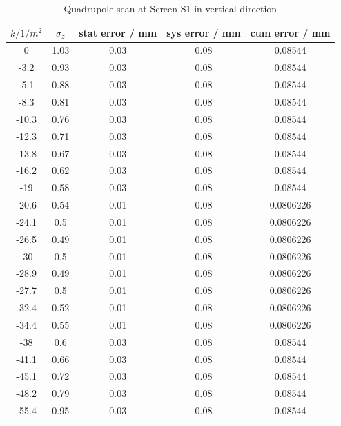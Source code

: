 \documentclass[11pt,a4paper,notitlepage]{scrartcl}
\begin{document}
\begin{table}[htbp]
		\centering
	\begin{tabular}{c|c|c|c|c}
		$k / 1/m^2$ & $\sigma_z$ & stat error / mm & sys error / mm & cum error / mm \\
		\hline
		\hline
		0         & 1.03    & 0.03            & 0.08           & 0.08544        \\
		-3.2      & 0.93    & 0.03            & 0.08           & 0.08544        \\
		-5.1      & 0.88    & 0.03            & 0.08           & 0.08544        \\
		-8.3      & 0.81    & 0.03            & 0.08           & 0.08544        \\
		-10.3     & 0.76    & 0.03            & 0.08           & 0.08544        \\
		-12.3     & 0.71    & 0.03            & 0.08           & 0.08544        \\
		-13.8     & 0.67    & 0.03            & 0.08           & 0.08544        \\
		-16.2     & 0.62    & 0.03            & 0.08           & 0.08544        \\
		-19       & 0.58    & 0.03            & 0.08           & 0.08544        \\
		-20.6     & 0.54    & 0.01            & 0.08           & 0.0806226      \\
		-24.1     & 0.5     & 0.01            & 0.08           & 0.0806226      \\
		-26.5     & 0.49    & 0.01            & 0.08           & 0.0806226      \\
		-30       & 0.5     & 0.01            & 0.08           & 0.0806226      \\
		-28.9     & 0.49    & 0.01            & 0.08           & 0.0806226      \\
		-27.7     & 0.5     & 0.01            & 0.08           & 0.0806226      \\
		-32.4     & 0.52    & 0.01            & 0.08           & 0.0806226      \\
		-34.4     & 0.55    & 0.01            & 0.08           & 0.0806226      \\
		-38       & 0.6     & 0.03            & 0.08           & 0.08544        \\
		-41.1     & 0.66    & 0.03            & 0.08           & 0.08544        \\
		-45.1     & 0.72    & 0.03            & 0.08           & 0.08544        \\
		-48.2     & 0.79    & 0.03            & 0.08           & 0.08544        \\
		-55.4     & 0.95    & 0.03            & 0.08           & 0.08544       
	\end{tabular}
\caption{Quadrupole scan at Screen S1 in vertical direction}
\label{tab:qscan1z}
\end{table}
\end{document}
